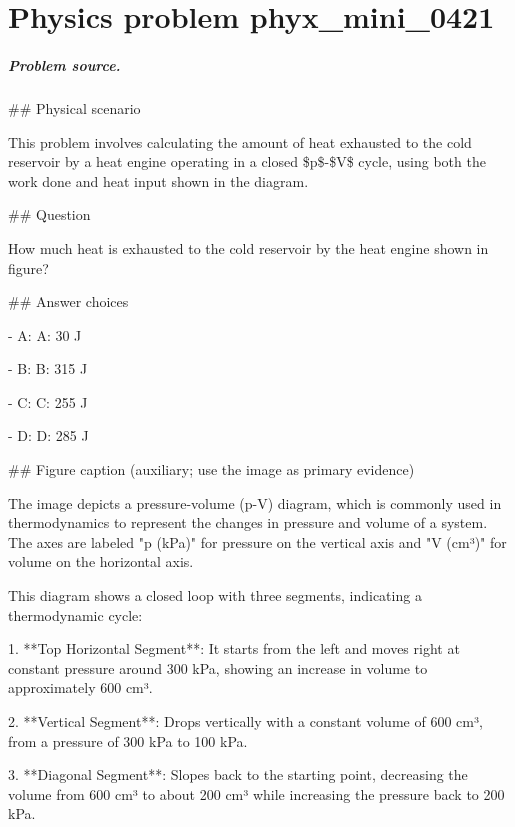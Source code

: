 
\chapter{Physics problem phyx\_mini\_0421}
\label{ch:PhyXMiniProblems_problem_phyx_mini_0421}

\paragraph{Problem source.}
\#\# Physical scenario

This problem involves calculating the amount of heat exhausted to the cold reservoir by a heat engine operating in a closed \$p\$-\$V\$ cycle, using both the work done and heat input shown in the diagram.

\#\# Question

How much heat is exhausted to the cold reservoir by the heat engine shown in figure?

\#\# Answer choices

- A: A: 30 J

- B: B: 315 J

- C: C: 255 J

- D: D: 285 J

\#\# Figure caption (auxiliary; use the image as primary evidence)

The image depicts a pressure-volume (p-V) diagram, which is commonly used in thermodynamics to represent the changes in pressure and volume of a system. The axes are labeled "p (kPa)" for pressure on the vertical axis and "V (cm³)" for volume on the horizontal axis.

This diagram shows a closed loop with three segments, indicating a thermodynamic cycle:

1. **Top Horizontal Segment**: It starts from the left and moves right at constant pressure around 300 kPa, showing an increase in volume to approximately 600 cm³.

2. **Vertical Segment**: Drops vertically with a constant volume of 600 cm³, from a pressure of 300 kPa to 100 kPa.

3. **Diagonal Segment**: Slopes back to the starting point, decreasing the volume from 600 cm³ to about 200 cm³ while increasing the pressure back to 200 kPa.

